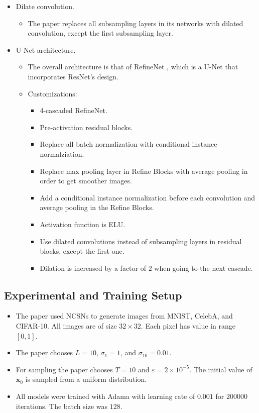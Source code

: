 \documentclass[10pt]{article}
\newcommand{\ve}[1]{\mathbf{#1}}
\begin{document}
\begin{itemize}
  \item Dilate convolution.
  \begin{itemize}
    \item The paper replaces all subsampling layers in its networks with dilated convolution, except the first subsampling layer.    
  \end{itemize}

  \item U-Net architecture.
  \begin{itemize}
    \item The overall architecture is that of RefineNet \cite{Lin:2016}, which is a U-Net that incorporates ResNet's design.
    
    \item Customizations:
    \begin{itemize}
      \item 4-cascaded RefineNet.
      \item Pre-activation residual blocks.
      \item Replace all batch normalization with conditional instance normalziation.
      \item Replace max pooling layer in Refine Blocks with average pooling in order to get smoother images.
      \item Add a conditional instance normalization before each convolution and average pooling in the Refine Blocks.
      \item Activation function is ELU.
      \item Use dilated convolutions instead of subsampling layers in residual blocks, except the first one.
      \item Dilation is increased by a factor of 2 when going to the next cascade.
    \end{itemize}
  \end{itemize}
\end{itemize}

\subsection{Experimental and Training Setup}

\begin{itemize}
  \item The paper used NCSNs to generate images from MNIST, CelebA, and CIFAR-10. All images are of size $32 \times 32$. Each pixel has value in range $[0,1]$.
  
  \item The paper chooses $L = 10$, $\sigma_1 = 1$, and $\sigma_10 = 0.01$.
  
  \item For sampling the paper chooses $T = 10$ and $\varepsilon = 2 \times 10^{-5}$. The initial value of $\ve{x}_0$ is sampled from a uniform distribution.
  
  \item All models were trained with Adama with learning rate of $0.001$ for $200000$ iterations. The batch size was $128$.
\end{itemize}
\end{document}
